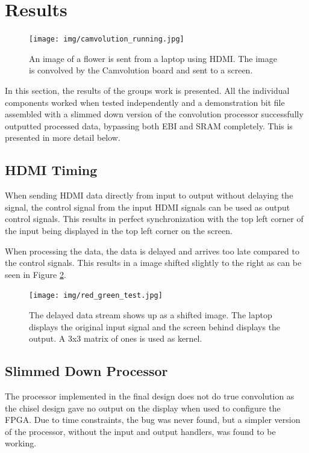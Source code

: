 \section{Results}

\begin{figure}
    \centering
    \texttt{[image: img/camvolution\_running.jpg]}
    \caption[The implemented system running]{
        An image of a flower is sent from a laptop using HDMI.
        The image is convolved by the Camvolution board and sent to a screen.
    }
    \label{fig:systemRunning}
\end{figure}

In this section, the results of the groups work is presented.
All the individual components worked when tested independently and a demonstration bit file assembled with a slimmed down version of the convolution processor successfully outputted processed data, bypassing both EBI and SRAM completely.
This is presented in more detail below.

\subsection{HDMI Timing}
When sending HDMI data directly from input to output without delaying the signal, the control signal from the input HDMI signals can be used as output control signals.
This results in perfect synchronization with the top left corner of the input being displayed in the top left corner on the screen.

When processing the data, the data is delayed and arrives too late compared to the control signals. This results in a image shifted slightly to the right as can be seen in Figure \ref{fig:SyncDelay}.

\begin{figure}
    \centering
    \texttt{[image: img/red\_green\_test.jpg]}
    \caption[The delayed data stream]{
        The delayed data stream shows up as a shifted image.
        The laptop displays the original input signal and the screen behind displays the output.
        A 3x3 matrix of ones is used as kernel.
    }
    \label{fig:SyncDelay}
\end{figure}

\subsection{Slimmed Down Processor}
The processor implemented in the final design does not do true convolution as the chisel design gave no output on the display when used to configure the FPGA.
Due to time constraints, the bug was never found, but a simpler version of the processor, without the input and output handlers, was found to be working.

